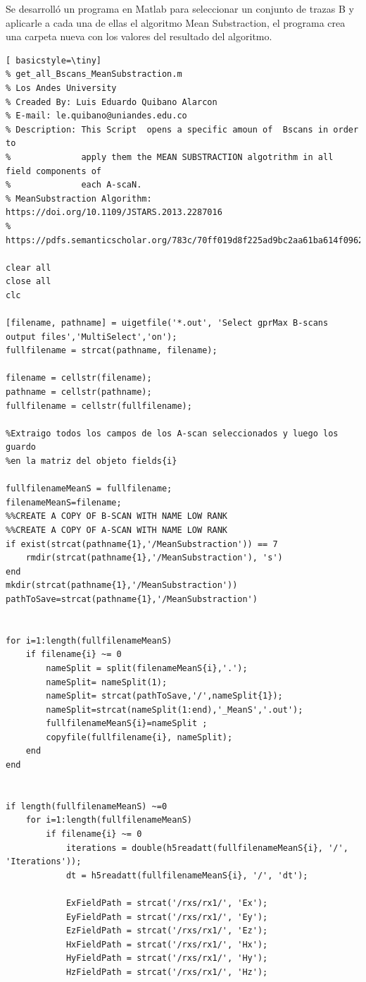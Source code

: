Se desarrolló un programa en Matlab  para seleccionar un conjunto de trazas B y aplicarle a cada una de ellas el algoritmo Mean Substraction, el programa crea una carpeta nueva con los valores del resultado del algoritmo.

\begin{lstlisting}[ basicstyle=\tiny] 
% get_all_Bscans_MeanSubstraction.m
% Los Andes University
% Creaded By: Luis Eduardo Quibano Alarcon
% E-mail: le.quibano@uniandes.edu.co
% Description: This Script  opens a specific amoun of  Bscans in order to
%              apply them the MEAN SUBSTRACTION algotrithm in all field components of
%              each A-scaN.
% MeanSubstraction Algorithm: https://doi.org/10.1109/JSTARS.2013.2287016
%                             https://pdfs.semanticscholar.org/783c/70ff019d8f225ad9bc2aa61ba614f09628ba.pdf

clear all
close all
clc

[filename, pathname] = uigetfile('*.out', 'Select gprMax B-scans output files','MultiSelect','on');
fullfilename = strcat(pathname, filename);

filename = cellstr(filename);
pathname = cellstr(pathname);
fullfilename = cellstr(fullfilename);

%Extraigo todos los campos de los A-scan seleccionados y luego los guardo
%en la matriz del objeto fields{i}

fullfilenameMeanS = fullfilename;
filenameMeanS=filename;
%%CREATE A COPY OF B-SCAN WITH NAME LOW RANK
%%CREATE A COPY OF A-SCAN WITH NAME LOW RANK
if exist(strcat(pathname{1},'/MeanSubstraction')) == 7
    rmdir(strcat(pathname{1},'/MeanSubstraction'), 's')
end
mkdir(strcat(pathname{1},'/MeanSubstraction'))
pathToSave=strcat(pathname{1},'/MeanSubstraction')


for i=1:length(fullfilenameMeanS)
    if filename{i} ~= 0
        nameSplit = split(filenameMeanS{i},'.');
        nameSplit= nameSplit(1);
        nameSplit= strcat(pathToSave,'/',nameSplit{1});
        nameSplit=strcat(nameSplit(1:end),'_MeanS','.out');
        fullfilenameMeanS{i}=nameSplit ;
        copyfile(fullfilename{i}, nameSplit);
    end
end


if length(fullfilenameMeanS) ~=0
    for i=1:length(fullfilenameMeanS)
        if filename{i} ~= 0
            iterations = double(h5readatt(fullfilenameMeanS{i}, '/', 'Iterations'));
            dt = h5readatt(fullfilenameMeanS{i}, '/', 'dt');
            
            ExFieldPath = strcat('/rxs/rx1/', 'Ex');
            EyFieldPath = strcat('/rxs/rx1/', 'Ey');
            EzFieldPath = strcat('/rxs/rx1/', 'Ez');
            HxFieldPath = strcat('/rxs/rx1/', 'Hx');
            HyFieldPath = strcat('/rxs/rx1/', 'Hy');
            HzFieldPath = strcat('/rxs/rx1/', 'Hz');
            

\end{lstlisting}
